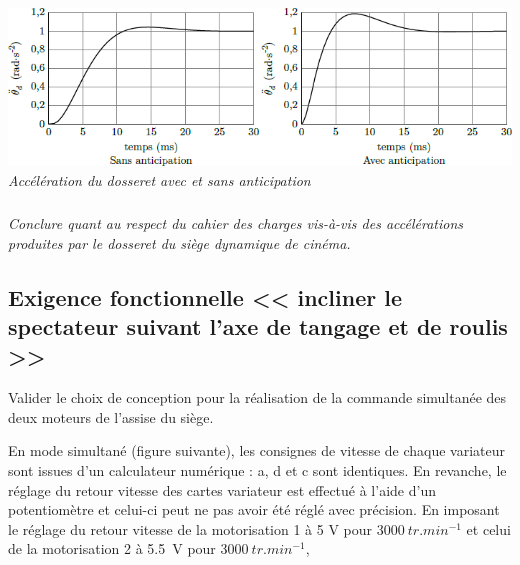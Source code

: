 \documentclass[10pt,fleqn]{article} %
\begin{document}
\begin{multicols}{2}
\begin{center}
\includegraphics[width=1.0\linewidth]{images/image18.png}
\textit{Accélération du dosseret avec et sans anticipation \label{fig17}}
\end{center}

\subparagraph{}\textit{Conclure quant au respect du cahier des charges vis-à-vis des
  accélérations produites par le dosseret du siège dynamique de cinéma.}
\ifprof
\begin{corrige}
\end{corrige}
\else
\fi


\subsection*{Exigence fonctionnelle << incliner le spectateur suivant l'axe de tangage et de roulis >>}
%


\begin{obj}

Valider le choix de conception pour la réalisation de la commande simultanée des deux moteurs de l'assise du siège.
\end{obj}

En mode simultané (figure suivante), les consignes de vitesse de chaque
variateur sont issues d'un calculateur numérique : a, d et c sont
identiques. En revanche, le réglage du retour vitesse des cartes
variateur est effectué à l'aide d'un potentiomètre et celui-ci peut ne
pas avoir été réglé avec précision. En imposant le réglage du retour
vitesse de la motorisation 1 à 5 V pour $\SI{3000}{tr.min^{-1}}$
et celui de la motorisation 2 à \SI{5,5}{V} pour $\SI{3000}{tr. min^{-1}}$,


\end{multicols}
\end{document}
